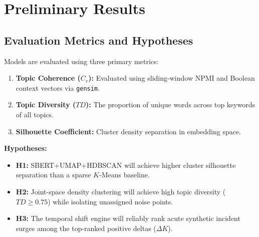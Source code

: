 \documentclass[sigconf,nonacm]{acmart}
\begin{document}
\section{Preliminary Results}

\begin{table}[H]
\centering
\small
\caption{Preliminary benchmark comparison on incident corpus.}
\label{tab:prelim_results}
\end{table}

\subsection{Evaluation Metrics and Hypotheses}
Models are evaluated using three primary metrics:
\begin{enumerate}
    \item \textbf{Topic Coherence ($C_v$):} Evaluated using sliding-window NPMI and Boolean context vectors \citep{roder2015exploring} via \texttt{gensim}.
    \item \textbf{Topic Diversity ($TD$):} The proportion of unique words across top keywords of all topics.
    \item \textbf{Silhouette Coefficient:} Cluster density separation in embedding space.
\end{enumerate}

\noindent \textbf{Hypotheses:}
\begin{itemize}
    \item \textbf{H1:} SBERT+UMAP+HDBSCAN will achieve higher cluster silhouette separation than a sparse $K$-Means baseline.
    \item \textbf{H2:} Joint-space density clustering will achieve high topic diversity ($TD \ge 0.75$) while isolating unassigned noise points.
    \item \textbf{H3:} The temporal shift engine will reliably rank acute synthetic incident surges among the top-ranked positive deltas ($\Delta K$).
\end{itemize}
\end{document}
